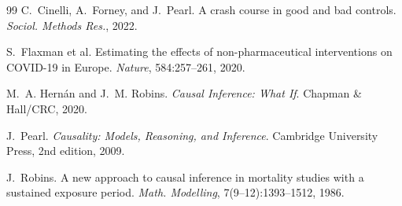 \documentclass[10pt,twocolumn]{article}
\theoremstyle{definition}
\begin{document}
{\begin{thebibliography}{99}
C.~Cinelli, A.~Forney, and J.~Pearl. A crash course in good and bad controls.
\emph{Sociol. Methods Res.}, 2022.

S.~Flaxman et al. Estimating the effects of non-pharmaceutical interventions on
COVID-19 in Europe. \emph{Nature}, 584:257--261, 2020.

M.~A. Hern\'an and J.~M. Robins. \emph{Causal Inference: What If}. Chapman \&
Hall/CRC, 2020.

J.~Pearl. \emph{Causality: Models, Reasoning, and Inference}. Cambridge
University Press, 2nd edition, 2009.

J.~Robins. A new approach to causal inference in mortality studies with a
sustained exposure period. \emph{Math. Modelling}, 7(9--12):1393--1512, 1986.

\end{thebibliography}
}
\end{document}
